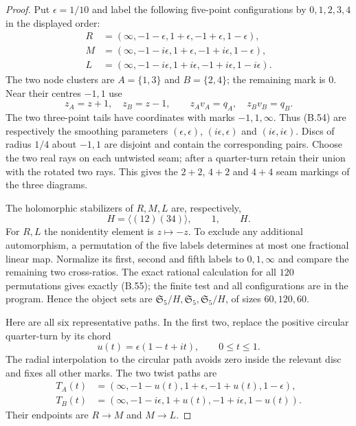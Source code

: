 \begin{proof}
Put $\epsilon=1/10$ and label the following five-point
configurations by $0,1,2,3,4$ in the displayed order:
\[
\begin{aligned}
 R&=(\infty,-1-\epsilon,1+\epsilon,-1+\epsilon,1-\epsilon),\\
 M&=(\infty,-1-i\epsilon,1+\epsilon,-1+i\epsilon,1-\epsilon),\\
 L&=(\infty,-1-i\epsilon,1+i\epsilon,-1+i\epsilon,1-i\epsilon).
\end{aligned}                                                     \tag{B.54}
\]
The two node clusters are $A=\{1,3\}$ and $B=\{2,4\}$;
the remaining mark is $0$.  Near their centres $-1,1$ use
\[
 z_A=z+1,\quad z_B=z-1,\qquad
 z_Av_A=q_A,\quad z_Bv_B=q_B.
\]
The two three-point tails have coordinates with marks
$-1,1,\infty$.  Thus (B.54) are respectively the smoothing
parameters $(\epsilon,\epsilon)$,
$(i\epsilon,\epsilon)$ and $(i\epsilon,i\epsilon)$.
Discs of radius $1/4$ about $-1,1$ are disjoint and contain
the corresponding pairs.  Choose the two real rays on each
untwisted seam; after a quarter-turn retain their union with
the rotated two rays.  This gives the $2+2$, $4+2$ and
$4+4$ seam markings of the three diagrams.

The holomorphic stabilizers of $R,M,L$ are, respectively,
\[
 H=\langle(12)(34)\rangle,\qquad 1,\qquad H.
                                                               \tag{B.55}
\]
For $R,L$ the nonidentity element is $z\mapsto-z$.
To exclude any additional automorphism, a permutation of
the five labels determines at most one fractional linear map.
Normalize its first, second and fifth labels to $0,1,\infty$
and compare the remaining two cross-ratios.  The exact rational
calculation for all $120$ permutations gives exactly (B.55);
the finite test and all configurations are in the program.
Hence the object sets are
$\mathfrak S_5/H,\mathfrak S_5,\mathfrak S_5/H$, of sizes
$60,120,60$.

Here are all six representative paths.  In the first two,
replace the positive circular quarter-turn by its chord
\[
 u(t)=\epsilon(1-t+it),\qquad 0\leq t\leq1.
\]
The radial interpolation to the circular path avoids zero
inside the relevant disc and fixes all other marks.  The
two twist paths are
\[
\begin{aligned}
 T_A(t)&=(\infty,-1-u(t),1+\epsilon,-1+u(t),1-\epsilon),\\
 T_B(t)&=(\infty,-1-i\epsilon,1+u(t),-1+i\epsilon,1-u(t)).
\end{aligned}                                                     \tag{B.56}
\]
Their endpoints are $R\to M$ and $M\to L$.


\end{proof}
